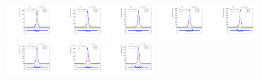 \begin{figure}[htb]
\centering
\includegraphics[width=0.19\textwidth]{plots/Appendix_Recoil_Fits/ZmmData_PF_5TeV_2G_bkg/pfu2fit_0.pdf}
\includegraphics[width=0.19\textwidth]{plots/Appendix_Recoil_Fits/ZmmData_PF_5TeV_2G_bkg/pfu2fit_1.pdf}
\includegraphics[width=0.19\textwidth]{plots/Appendix_Recoil_Fits/ZmmData_PF_5TeV_2G_bkg/pfu2fit_2.pdf}
\includegraphics[width=0.19\textwidth]{plots/Appendix_Recoil_Fits/ZmmData_PF_5TeV_2G_bkg/pfu2fit_3.pdf}
\includegraphics[width=0.19\textwidth]{plots/Appendix_Recoil_Fits/ZmmData_PF_5TeV_2G_bkg/pfu2fit_4.pdf}
\includegraphics[width=0.19\textwidth]{plots/Appendix_Recoil_Fits/ZmmData_PF_5TeV_2G_bkg/pfu2fit_5.pdf}
\includegraphics[width=0.19\textwidth]{plots/Appendix_Recoil_Fits/ZmmData_PF_5TeV_2G_bkg/pfu2fit_6.pdf}
\includegraphics[width=0.19\textwidth]{plots/Appendix_Recoil_Fits/ZmmData_PF_5TeV_2G_bkg/pfu2fit_7.pdf}

\end{figure}
